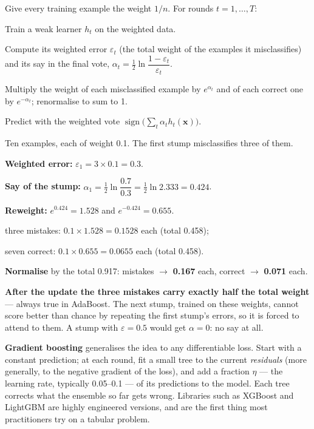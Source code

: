 \begin{definitionbox}[AdaBoost]
Give every training example the weight $1/n$. For rounds $t = 1, \dots, T$:
\begin{tightnum}
  \item Train a weak learner $h_t$ on the weighted data.
  \item Compute its weighted error $\varepsilon_t$ (the total weight of the examples it
        misclassifies) and its say in the final vote,
        $\alpha_t = \tfrac{1}{2}\ln\dfrac{1 - \varepsilon_t}{\varepsilon_t}$.
  \item Multiply the weight of each misclassified example by $e^{\alpha_t}$ and of each
        correct one by $e^{-\alpha_t}$; renormalise to sum to 1.
\end{tightnum}
Predict with the weighted vote $\operatorname{sign}\big(\sum_t \alpha_t h_t(\mathbf{x})\big)$.
\end{definitionbox}

\begin{worked}
Ten examples, each of weight 0.1. The first stump misclassifies three of them.

\smallskip
\textbf{Weighted error:} $\varepsilon_1 = 3 \times 0.1 = 0.3$.

\textbf{Say of the stump:} $\alpha_1 = \tfrac{1}{2}\ln\dfrac{0.7}{0.3} = \tfrac{1}{2}\ln 2.333 = \mathbf{0.424}$.

\textbf{Reweight:} $e^{0.424} = 1.528$ and $e^{-0.424} = 0.655$.
\begin{tight}
  \item three mistakes: $0.1 \times 1.528 = 0.1528$ each (total 0.458);
  \item seven correct: $0.1 \times 0.655 = 0.0655$ each (total 0.458).
\end{tight}
\textbf{Normalise} by the total 0.917: mistakes $\to$ \textbf{0.167} each, correct
$\to$ \textbf{0.071} each.

\smallskip
\textbf{After the update the three mistakes carry exactly half the total weight}
--- always true in AdaBoost. The next stump, trained on these weights, cannot score
better than chance by repeating the first stump's errors, so it is forced to attend
to them. A stump with $\varepsilon = 0.5$ would get $\alpha = 0$: no say at all.
\end{worked}

\textbf{Gradient boosting} generalises the idea to any differentiable loss. Start
with a constant prediction; at each round, fit a small tree to the current
\emph{residuals} (more generally, to the negative gradient of the loss), and add a
fraction $\eta$ --- the learning rate, typically 0.05--0.1 --- of its predictions to
the model. Each tree corrects what the ensemble so far gets wrong. Libraries such as
XGBoost and LightGBM are highly engineered versions, and are the first thing most
practitioners try on a tabular problem.

